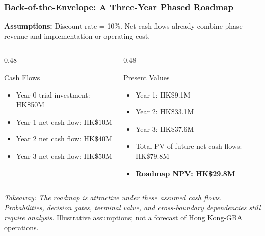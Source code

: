 \documentclass{beamer}
\begin{document}
\begin{frame}[t,shrink=12]
\frametitle{Back-of-the-Envelope: A Three-Year Phased Roadmap}
\textbf{Assumptions:} Discount rate = 10\%. Net cash flows already combine phase revenue and implementation or operating cost.
\begin{columns}[T]
\begin{column}{0.48\textwidth}\begin{block}{Cash Flows}
\begin{itemize}
\item Year 0 trial investment: $-$HK\$50M
\item Year 1 net cash flow: HK\$10M
\item Year 2 net cash flow: HK\$40M
\item Year 3 net cash flow: HK\$50M
\end{itemize}\end{block}\end{column}
\begin{column}{0.48\textwidth}\begin{block}{Present Values}
\begin{itemize}
\item Year 1: HK\$9.1M
\item Year 2: HK\$33.1M
\item Year 3: HK\$37.6M
\item Total PV of future net cash flows: HK\$79.8M
\item \textbf{Roadmap NPV: HK\$29.8M}
\end{itemize}\end{block}\end{column}
\end{columns}
\textit{Takeaway: The roadmap is attractive under these assumed cash flows. Probabilities, decision gates, terminal value, and cross-boundary dependencies still require analysis.}
\vfill{\tiny Illustrative assumptions; not a forecast of Hong Kong-GBA operations.}
\end{frame}
\end{document}
